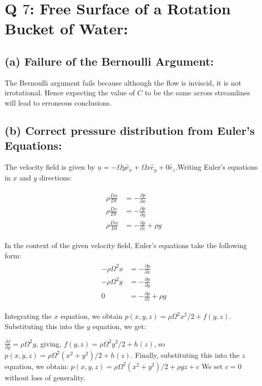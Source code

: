 \documentclass{article}
\begin{document}
\section{Q $7$: Free Surface of a Rotation Bucket of Water:}
\subsection*{(a) Failure of the Bernoulli Argument:}
The Bernoulli argument fails because although the flow is inviscid, it is not irrotational. Hence expecting the value of $C$ to be the same across streamlines will lead to erroneous conclusions. 

\subsection*{(b) Correct pressure distribution from Euler's Equations:}
The velocity field is given by $\underline{u}= -\Omega  y \hat{e}_{x} + \Omega  x \hat{e}_{y} + 0 \hat{e}_{z}$.Writing Euler's equations in $x$ and $y$ directions:

\begin{align}\label{eq:euler_eqns}
 \begin{split}
  \rho \frac{Du}{Dt} &= -\frac{\partial p}{\partial x} \\
  \rho \frac{Dv}{Dt} &= -\frac{\partial p}{\partial y}\\
  \rho \frac{Dw}{Dt} &= -\frac{\partial p}{\partial z} + \rho g
 \end{split}
\end{align}

In the context of the given velocity field, Euler's equations take the following form:
\begin{align}\label{eq:bucket_euler_eqns}
 \begin{split}
  -\rho \Omega^{2} x &= -\frac{\partial p}{\partial x} \\
  -\rho \Omega^{2} y  &= -\frac{\partial p}{\partial y}\\
  0 &= -\frac{\partial p}{\partial z} + \rho g
 \end{split}
\end{align}

Integrating the $x$ equation, we obtain
$p(x, y, z) = \rho \Omega^{2} x^{2}/2 + f(y, z)$. Substituting this into the $y$ equation, we get:

$\frac{\partial f}{\partial y} = \rho \Omega^{2} y$, giving, $f(y, z) = \rho \Omega^{2} y^{2}/2 + h(z)$, so $p(x, y, z) = \rho \Omega^{2} (x^{2} + y^{2})/2 + h(z)$. 
Finally, substituting this into the $z$ equation, we obtain:
$p(x, y, z) = \rho \Omega^{2} (x^{2} + y^{2})/2 + \rho g z + c$ We set $c = 0$ without loss of generality. 
\end{document}
